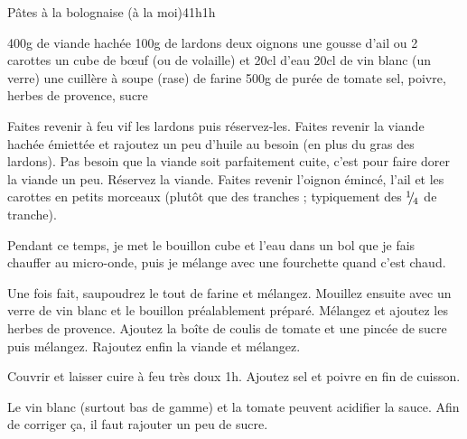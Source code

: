 \begin{recette}{Pâtes à la bolognaise (à la moi)}{4}{1h}{1h}
\begin{ingredients}
\ingredient 400g de viande hachée
\ingredient 100g de lardons
\ingredient deux oignons
\ingredient une gousse d'ail
 ou 2 carottes
\ingredient un cube de bœuf (ou de volaille) et 20cl d'eau
\ingredient 20cl de vin blanc (un verre)
\ingredient une cuillère à soupe (rase) de farine
\ingredient 500g de purée de tomate
\ingredient sel, poivre, herbes de provence, sucre
\end{ingredients}

\begin{preparation}
\etape Faites revenir à feu vif les lardons puis réservez-les.
\etape Faites revenir la viande hachée émiettée et rajoutez un peu d'huile au besoin (en plus du gras des lardons). Pas besoin que la viande soit parfaitement cuite, c'est pour faire dorer la viande un peu.
\etape Réservez la viande.
\etape Faites revenir l'oignon émincé, l'ail et les carottes en petits morceaux (plutôt que des tranches ; typiquement des ${{}^{1\!\!}/ _{\!4}}$ de tranche).
\begin{remarque}
Pendant ce temps, je met le bouillon cube et l'eau dans un bol que je fais chauffer au micro-onde, puis je mélange avec une fourchette quand c'est chaud.
\end{remarque}
\etape Une fois fait, saupoudrez le tout de farine et mélangez. Mouillez ensuite avec un verre de vin blanc et le bouillon préalablement préparé. Mélangez et ajoutez les herbes de provence.
\etape Ajoutez la boîte de coulis de tomate et une pincée de sucre puis mélangez.
\etape Rajoutez enfin la viande et mélangez.
\end{preparation}

\begin{cuisson}
Couvrir et laisser cuire à feu très doux 1h. Ajoutez sel et poivre en fin de cuisson.
\begin{remarque}
Le vin blanc (surtout bas de gamme) et la tomate peuvent acidifier la sauce. Afin de corriger ça, il faut rajouter un peu de sucre.
\end{remarque}
\end{cuisson}
\end{recette}

